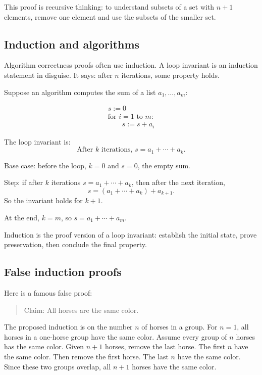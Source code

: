 This proof is recursive thinking: to understand subsets of a set with $n+1$ elements, remove one element and use the subsets of the smaller set.

\subsection{Induction and algorithms}

Algorithm correctness proofs often use induction. A loop invariant is an induction statement in disguise. It says: after $n$ iterations, some property holds.

Suppose an algorithm computes the sum of a list $a_1,\ldots,a_m$:

\[
\begin{array}{l}
s:=0\\
\text{for }i=1\text{ to }m:\\
\qquad s:=s+a_i
\end{array}
\]

The loop invariant is:
\[
\text{After }k\text{ iterations, }s=a_1+\cdots+a_k.
\]

Base case: before the loop, $k=0$ and $s=0$, the empty sum.

Step: if after $k$ iterations $s=a_1+\cdots+a_k$, then after the next iteration,
\[
s=(a_1+\cdots+a_k)+a_{k+1}.
\]
So the invariant holds for $k+1$.

At the end, $k=m$, so $s=a_1+\cdots+a_m$.

\begin{intuitionbox}
Induction is the proof version of a loop invariant: establish the initial state, prove preservation, then conclude the final property.
\end{intuitionbox}

\subsection{False induction proofs}

Here is a famous false proof:

\begin{quote}
Claim: All horses are the same color.
\end{quote}

The proposed induction is on the number $n$ of horses in a group. For $n=1$, all horses in a one-horse group have the same color. Assume every group of $n$ horses has the same color. Given $n+1$ horses, remove the last horse. The first $n$ have the same color. Then remove the first horse. The last $n$ have the same color. Since these two groups overlap, all $n+1$ horses have the same color.

